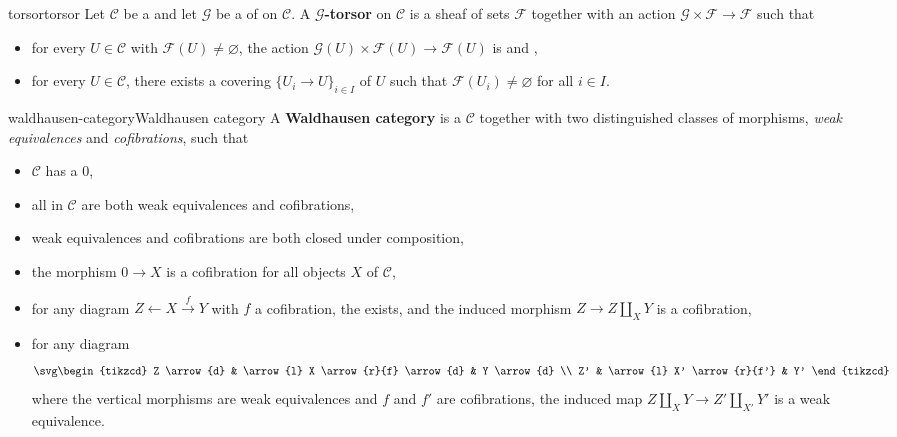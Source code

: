 \begin{topic}{torsor}{torsor}
    Let $\mathcal{C}$ be a  and let $\mathcal{G}$ be a  of  on $\mathcal{C}$. A \textbf{$\mathcal{G}$-torsor} on $\mathcal{C}$ is a sheaf of sets $\mathcal{F}$ together with an action $\mathcal{G} \times \mathcal{F} \to \mathcal{F}$ such that
    \begin{itemize}
        \item for every $U \in \mathcal{C}$ with $\mathcal{F}(U) \neq \varnothing$, the action $\mathcal{G}(U) \times \mathcal{F}(U) \to \mathcal{F}(U)$ is  and ,
        \item for every $U \in \mathcal{C}$, there exists a covering $\{ U_i \to U \}_{i \in I}$ of $U$ such that $\mathcal{F}(U_i) \neq \varnothing$ for all $i \in I$.
    \end{itemize}
\end{topic}

\begin{topic}{waldhausen-category}{Waldhausen category}
    A \textbf{Waldhausen category} is a  $\mathcal{C}$ together with two distinguished classes of morphisms, \textit{weak equivalences} and \textit{cofibrations}, such that
    \begin{itemize}
        \item $\mathcal{C}$ has a  $0$,
        \item all  in $\mathcal{C}$ are both weak equivalences and cofibrations,
        \item weak equivalences and cofibrations are both closed under composition,
        \item the morphism $0 \to X$ is a cofibration for all objects $X$ of $\mathcal{C}$,
        \item for any diagram $Z \leftarrow X \xrightarrow{f} Y$ with $f$ a cofibration, the  exists, and the induced morphism $Z \to Z \coprod_X Y$ is a cofibration,
        \item for any diagram
        \[ \svg \begin{tikzcd}
            Z \arrow{d} & \arrow{l} X \arrow{r}{f} \arrow{d} & Y \arrow{d} \\
            Z' & \arrow{l} X' \arrow{r}{f'} & Y'
        \end{tikzcd} \]
        where the vertical morphisms are weak equivalences and $f$ and $f'$ are cofibrations, the induced map $Z \coprod_X Y \to Z' \coprod_{X'} Y'$ is a weak equivalence.
    \end{itemize}
\end{topic}


